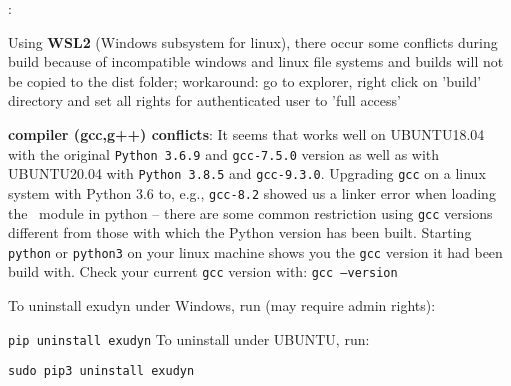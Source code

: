 :
\bi
  \item Using {\bf WSL2} (Windows subsystem for linux), there occur some conflicts during build because of incompatible windows and linux file systems and builds will not be copied to the dist folder; workaround: go to explorer, right click on 'build' directory and set all rights for authenticated user to 'full access'
  \item {\bf compiler (gcc,g++) conflicts}: It seems that \codeName works well on UBUNTU18.04 with the original \texttt{Python 3.6.9} and \texttt{gcc-7.5.0} version as well as with UBUNTU20.04 with \texttt{Python 3.8.5} and \texttt{gcc-9.3.0}. Upgrading \texttt{gcc} on a linux system with Python 3.6 to, e.g., \texttt{gcc-8.2} showed us a linker error when loading the \codeName\ module in python -- there are some common restriction using \texttt{gcc} versions different from those with which the Python version has been built. Starting \texttt{python} or \texttt{python3} on your linux machine shows you the \texttt{gcc} version it had been build with.
	Check your current \texttt{gcc} version with: \texttt{gcc --version}
\ei


To uninstall exudyn under Windows, run (may require admin rights):
\bi
  \item[] \texttt{pip uninstall exudyn}
\ei
\noindent To uninstall under UBUNTU, run:
\bi
  \item[] \texttt{sudo pip3 uninstall exudyn}
\ei

